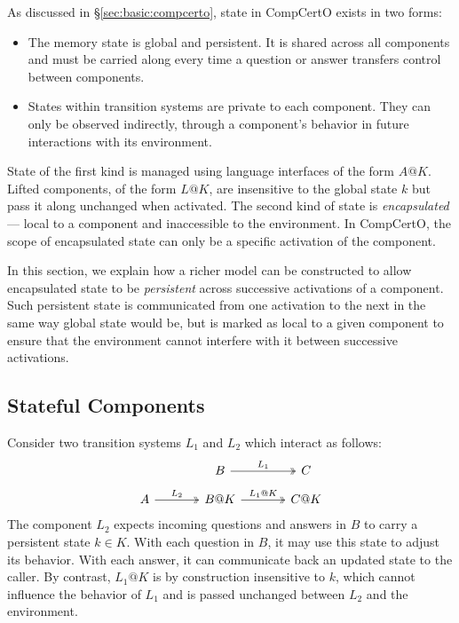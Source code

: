 \documentclass[acmsmall,screen,review,anonymous]{acmart}
\begin{document}
As discussed in \S\ref{sec:basic:compcerto},
state in CompCertO exists in two forms:
\begin{itemize}
  \item The memory state is global and persistent.
    It is shared across all components
    and must be carried along
    every time a question or answer transfers control
    between components.
  \item States within transition systems
    are private to each component.
    They can only be observed indirectly,
    through a component's behavior
    in future interactions with its environment.
\end{itemize}
State of the first kind
is managed using language interfaces
of the form $A@K$.
Lifted components, of the form $L@K$,
are insensitive to the global state $k$
but pass it along unchanged
when activated.
The second kind of state is \emph{encapsulated}---%
local to a component
and inaccessible to the environment.
In CompCertO, the scope of encapsulated state
can only be a specific activation of the component.

In this section,
we explain how a richer model can be constructed
to allow encapsulated state
to be \emph{persistent} across
successive activations of a component.
Such persistent state
is communicated from one activation to the next
in the same way global state would be,
but is marked as local to a given component
to ensure that the environment cannot interfere
with it between successive activations.


\subsection{Stateful Components} %

Consider two transition systems $L_1$ and $L_2$
which interact as follows:
\[
  \begin{tikzcd}[row sep=small, column sep=large]
    & B \ar[r, twoheadrightarrow, "L_1"] & C \\
    A \ar[r, twoheadrightarrow, "L_2"] &
    B@K \ar[r, twoheadrightarrow, "L_1@K"] &
    C@K
  \end{tikzcd}
\]
The component $L_2$ expects
incoming questions and answers in $B$
to carry a persistent state $k \in K$.
With each question in $B$,
it may use this state to adjust its behavior.
With each answer,
it can communicate back an updated state to the caller.
By contrast,
$L_1@K$ is by construction insensitive to $k$,
which cannot influence the behavior of $L_1$
and is passed unchanged
between $L_2$ and the environment.
\end{document}
